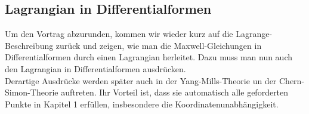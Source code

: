 \subsection{Lagrangian in Differentialformen}

Um den Vortrag abzurunden, kommen wir wieder kurz auf die Lagrange-Beschreibung zurück und zeigen, wie man die Maxwell-Gleichungen in Differentialformen durch einen Lagrangian herleitet. Dazu muss man nun auch den Lagrangian in Differentialformen ausdrücken. \\
Derartige Ausdrücke werden später auch in der Yang-Mills-Theorie un der Chern-Simon-Theorie auftreten. Ihr Vorteil ist, dass sie automatisch alle geforderten Punkte in Kapitel 1 erfüllen, insbesondere die Koordinatenunabhängigkeit.
